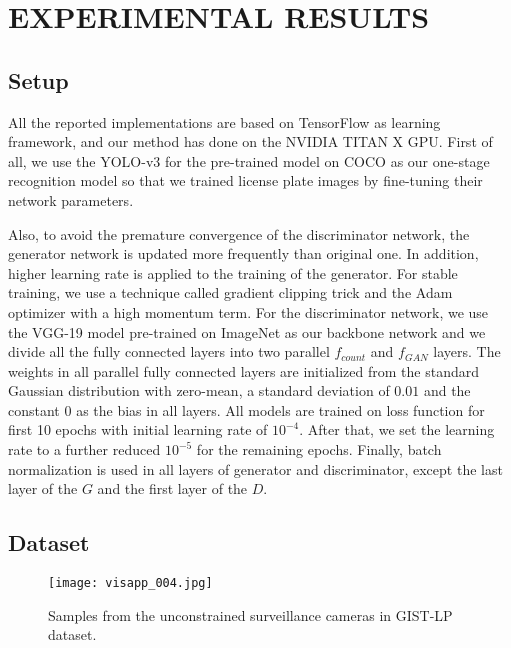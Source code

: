 \documentclass[a4paper,twoside]{article}
\begin{document}
\section{\uppercase{Experimental results}}

\subsection{Setup}
     All the reported implementations are based on TensorFlow as learning framework, and our method has done on the NVIDIA TITAN X GPU. First of all, we use the YOLO-v3 for the pre-trained model on COCO \cite{lin2014microsoft} as our one-stage recognition model so that we trained license plate images by fine-tuning their network parameters. 
     
     Also, to avoid the premature convergence of the discriminator network, the generator network is updated more frequently than original one. In addition, higher learning rate is applied to the training of the generator. For stable training, we use a technique called gradient clipping trick \cite{pascanu2013difficulty} and the Adam optimizer \cite{kingma2014adam} with a high momentum term. For the discriminator network, we use the VGG-19 \cite{simonyan2014very} model pre-trained on ImageNet as our backbone network and we divide all the fully connected layers into two parallel $f_{count}$ and $f_{GAN}$ layers. The weights in all parallel fully connected layers are initialized from the standard Gaussian distribution with zero-mean, a standard deviation of $0.01$ and the constant $0$ as the bias in all layers. All models are trained on loss function for first 10 epochs with initial learning rate of $10^{-4}$. After that, we set the learning rate to a further reduced $10^{-5}$ for the remaining epochs. Finally, batch normalization \cite{ioffe2015batch} is used in all layers of generator and discriminator, except the last layer of the $G$ and the first layer of the $D$. 
\subsection{Dataset}

\begin{figure*}[t]
    \begin{center}
\texttt{[image: visapp\_004.jpg]}
    \end{center}
       \caption{Samples from the unconstrained surveillance cameras in GIST-LP dataset.}
    \label{fig:long}
    \label{fig:onecol}
    \end{figure*}
    
\end{document}
